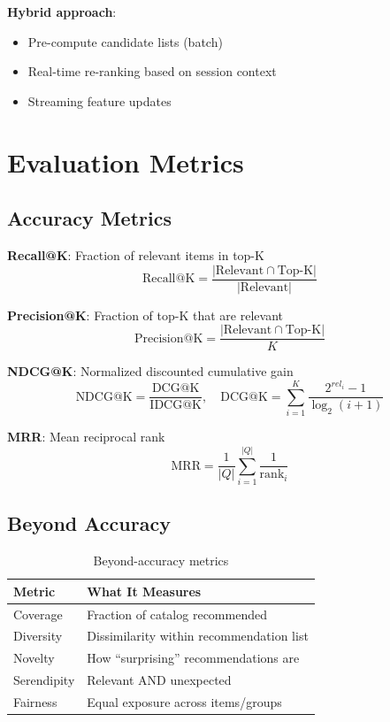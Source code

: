 \textbf{Hybrid approach}:
\begin{itemize}
    \item Pre-compute candidate lists (batch)
    \item Real-time re-ranking based on session context
    \item Streaming feature updates
\end{itemize}

\section{Evaluation Metrics}
\label{sec:recsys_metrics}

\subsection{Accuracy Metrics}

\textbf{Recall@K}: Fraction of relevant items in top-K
\begin{equation}
\text{Recall@K} = \frac{|\text{Relevant} \cap \text{Top-K}|}{|\text{Relevant}|}
\end{equation}

\textbf{Precision@K}: Fraction of top-K that are relevant
\begin{equation}
\text{Precision@K} = \frac{|\text{Relevant} \cap \text{Top-K}|}{K}
\end{equation}

\textbf{NDCG@K}: Normalized discounted cumulative gain
\begin{equation}
\text{NDCG@K} = \frac{\text{DCG@K}}{\text{IDCG@K}}, \quad \text{DCG@K} = \sum_{i=1}^{K} \frac{2^{rel_i} - 1}{\log_2(i+1)}
\end{equation}

\textbf{MRR}: Mean reciprocal rank
\begin{equation}
\text{MRR} = \frac{1}{|Q|} \sum_{i=1}^{|Q|} \frac{1}{\text{rank}_i}
\end{equation}

\subsection{Beyond Accuracy}

\begin{table}[H]
\centering
\caption{Beyond-accuracy metrics}
\begin{tabularx}{\textwidth}{lX}
\toprule
\textbf{Metric} & \textbf{What It Measures} \\
\midrule
Coverage & Fraction of catalog recommended \\
Diversity & Dissimilarity within recommendation list \\
Novelty & How ``surprising'' recommendations are \\
Serendipity & Relevant AND unexpected \\
Fairness & Equal exposure across items/groups \\
\bottomrule
\end{tabularx}
\end{table}

